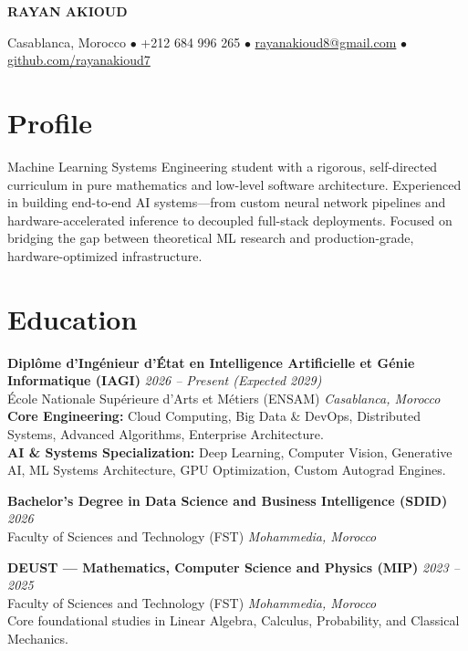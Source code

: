 \documentclass[11pt,a4paper]{article}
\newcommand{\name}[1]{\centerline{\Huge\bfseries\color{darkblue} #1}\vspace{2pt}}
\newcommand{\contact}[1]{\centerline{\small\color{accentgray} #1}\vspace{6pt}}
\begin{document}
\name{RAYAN AKIOUD}
\contact{
    Casablanca, Morocco \quad $\bullet$ \quad +212 684 996 265 \quad $\bullet$ \quad
    \href{mailto:rayanakioud8@gmail.com}{rayanakioud8@gmail.com} \quad $\bullet$ \quad
    \href{https://github.com/rayanakioud7}{github.com/rayanakioud7}
}

\section{Profile}
\justify
Machine Learning Systems Engineering student with a rigorous, self-directed curriculum in pure mathematics and low-level software architecture. Experienced in building end-to-end AI systems—from custom neural network pipelines and hardware-accelerated inference to decoupled full-stack deployments. Focused on bridging the gap between theoretical ML research and production-grade, hardware-optimized infrastructure.

\section{Education}

\textbf{Diplôme d'Ingénieur d'État en Intelligence Artificielle et Génie Informatique (IAGI)} \hfill \textit{2026 -- Present (Expected 2029)}\\
École Nationale Supérieure d'Arts et Métiers (ENSAM) \hfill \textit{Casablanca, Morocco}\\
{\small\color{accentgray}
\textbf{Core Engineering:} Cloud Computing, Big Data \& DevOps, Distributed Systems, Advanced Algorithms, Enterprise Architecture.\\
\textbf{AI \& Systems Specialization:} Deep Learning, Computer Vision, Generative AI, ML Systems Architecture, GPU Optimization, Custom Autograd Engines.
}

\vspace{4pt}


\textbf{Bachelor's Degree in Data Science and Business Intelligence (SDID)} \hfill \textit{2026}\\
Faculty of Sciences and Technology (FST) \hfill \textit{Mohammedia, Morocco}

\vspace{4pt}

\textbf{DEUST --- Mathematics, Computer Science and Physics (MIP)} \hfill \textit{2023 -- 2025}\\
Faculty of Sciences and Technology (FST) \hfill \textit{Mohammedia, Morocco}\\
{\small\color{accentgray}Core foundational studies in Linear Algebra, Calculus, Probability, and Classical Mechanics.}
\end{document}
